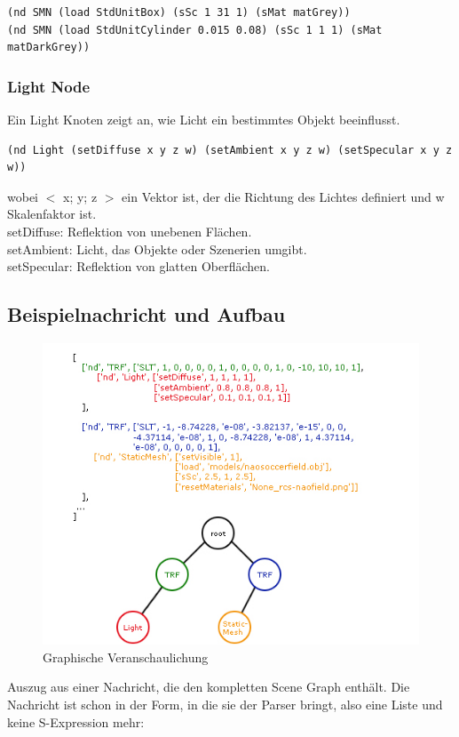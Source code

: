 \begin{verbatim}(nd SMN (load StdUnitBox) (sSc 1 31 1) (sMat matGrey))
(nd SMN (load StdUnitCylinder 0.015 0.08) (sSc 1 1 1) (sMat matDarkGrey))
\end{verbatim}
\subsubsection{Light Node}
Ein Light Knoten zeigt an, wie Licht ein bestimmtes Objekt beeinflusst.

\begin{verbatim}(nd Light (setDiffuse x y z w) (setAmbient x y z w) (setSpecular x y z w))
\end{verbatim}
wobei $<$ x; y; z $>$ ein Vektor ist, der die Richtung des Lichtes definiert und w Skalenfaktor ist.\\
setDiffuse: Reflektion von unebenen Flächen.\\
setAmbient: Licht, das Objekte oder Szenerien umgibt.\\
setSpecular: Reflektion von glatten Oberflächen.

\subsection{Beispielnachricht und Aufbau}
\begin{figure}[h]
\begin{center}
\includegraphics[scale=0.6]{Scene}
\end{center}
\caption{Graphische Veranschaulichung}
\end{figure}
Auszug aus einer Nachricht, die den kompletten Scene Graph enthält. 
Die Nachricht ist schon in der Form, in die sie der Parser bringt, also 
eine Liste und keine S-Expression mehr:

